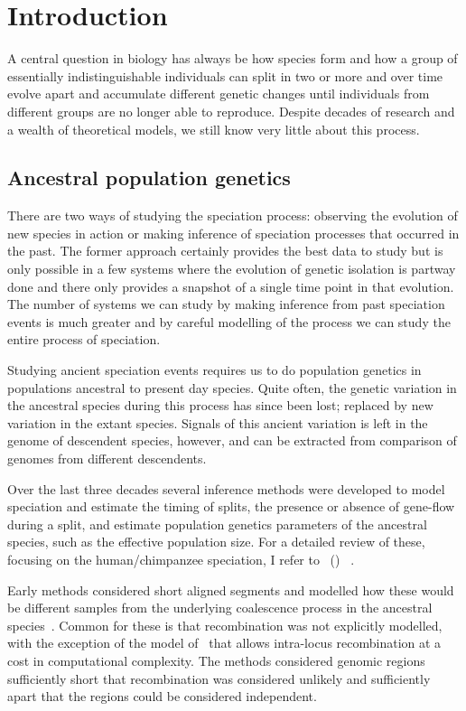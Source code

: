 
\chapter{Introduction}

A central question in biology has always be how species form and how a group of essentially indistinguishable individuals can split in two or more and over time evolve apart and accumulate different genetic changes until individuals from different groups are no longer able to reproduce. Despite decades of research and a wealth of theoretical models, we still know very little about this process.

\section{Ancestral population genetics}

There are two ways of studying the speciation process: observing the evolution of new species in action or making inference of speciation processes that occurred in the past. The former approach certainly provides the best data to study but is only possible in a few systems where the evolution of genetic isolation is partway done and there only provides a snapshot of a single time point in that evolution. The number of systems we can study by making inference from past speciation events is much greater and by careful modelling of the process we can study the entire process of speciation.

Studying ancient speciation events requires us to do population genetics in populations ancestral to present day species. Quite often, the genetic variation in the ancestral species during this process has since been lost; replaced by new variation in the extant species. Signals of this ancient variation is left in the genome of descendent species, however, and can be extracted from comparison of genomes from different descendents.

Over the last three decades several inference methods were developed to model speciation and estimate the timing of splits, the presence or absence of gene-flow during a split, and estimate population genetics parameters of the ancestral species, such as the effective population size. For a detailed review of these, focusing on the human/chimpanzee speciation, I refer to~\citeauthor{Mailund:2014gx} (\citeyear{Mailund:2014gx}) \emph{}~\citep{Mailund:2014gx}.

Early methods considered short aligned segments and modelled how these would be different samples from the underlying coalescence process in the ancestral species~\cite{Takahata1995Divergence-time,Innan2006The-effect-of-g,Burgess2008Estimation-of-h,Rannala2003,Yang2010,Yang2006,Yang2002,Becquet:2009ht,Wu:2004ib,Chen:2001dk,Wall2003}. Common for these is that recombination was not explicitly modelled, with the exception of the model of~\citet{Becquet2007A-new-approach-} that allows intra-locus recombination at a cost in computational complexity. The methods considered genomic regions sufficiently short that recombination was considered unlikely and sufficiently apart that the regions could be considered independent.

